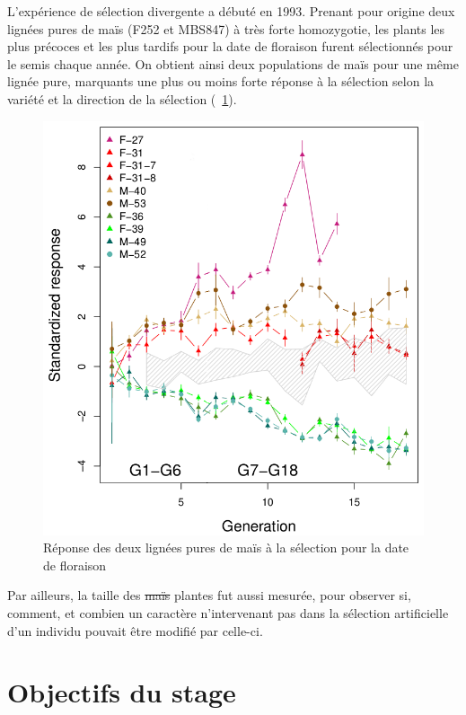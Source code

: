 \documentclass[12pt,a4paper]{report}
\newcommand{\com}[1]{{\noindent  \color{red}#1}}
\begin{document}
				L'expérience de sélection divergente a débuté en 1993. Prenant pour origine deux lignées pures de maïs (F252 et MBS847) à très forte homozygotie, les plan\com{t}s les plus précoces et les plus tardifs pour la date de floraison furent sélectionnés pour le semis chaque année. On obtient ainsi deux populations de maïs pour une même lignée pure, marquants une plus ou moins forte réponse à la sélection selon la variété et la direction de la sélection (~\ref{sélection}).
				\begin{figure}
					\centering
					\includegraphics[width = 13.7 cm]{selection.png}
					\caption{Réponse des deux lignées pures de maïs à la sélection pour la date de floraison}
					\label{sélection}
				\end{figure}
				
				Par ailleurs, la taille des \sout{maïs} \com{plantes} fut aussi mesurée, pour observer si, comment, et combien un caractère n'intervenant pas dans la sélection artificielle d'un individu pouvait être modifié par celle-ci.
			
		\section{Objectifs du stage}
		
\end{document}
